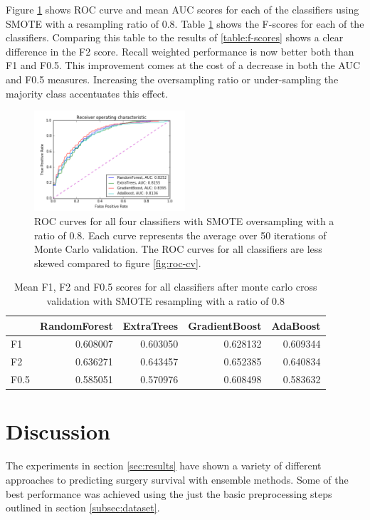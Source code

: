 \documentclass[journal]{IEEEtran}
\begin{document}
Figure \ref{fig:roc-smote} shows ROC curve and mean AUC scores for each of the classifiers using SMOTE with a resampling ratio of 0.8. Table \ref{table:f-score-smote} shows the F-scores for each of the classifiers. Comparing this table to the results of \ref{table:f-scores} shows a clear difference in the F2 score. Recall weighted performance is now better both than F1 and F0.5. This improvement comes at the cost of a decrease in both the AUC and F0.5 measures. Increasing the oversampling ratio or under-sampling the majority class accentuates this effect.

\begin{figure}[!t]
\centering
\includegraphics[width=0.5\textwidth]{../src/img/roc_smote.png}
\caption{ROC curves for all four classifiers with SMOTE oversampling with a ratio of 0.8. Each curve represents the average over 50 iterations of Monte Carlo validation. The ROC curves for all classifiers are less skewed compared to figure \ref{fig:roc-cv}.}
\label{fig:roc-smote}
\end{figure}

\begin{table}
\caption{Mean F1, F2 and F0.5 scores for all classifiers after monte carlo cross validation with SMOTE resampling with a ratio of 0.8}

\begin{tabular}{lrrrr}
{} &  RandomForest &  ExtraTrees &  GradientBoost &  AdaBoost \\
\hline
F1   &      0.608007 &    0.603050 &       0.628132 &  0.609344 \\
F2   &      0.636271 &    0.643457 &       0.652385 &  0.640834 \\
F0.5 &      0.585051 &    0.570976 &       0.608498 &  0.583632 \\
\end{tabular}

\label{table:f-score-smote}
\end{table}

\section{Discussion}
\label{sec:discussion}
The experiments in section \ref{sec:results} have shown a variety of different approaches to predicting surgery survival with ensemble methods. Some of the best performance was achieved using the just the basic preprocessing steps outlined in section \ref{subsec:dataset}.
\end{document}
